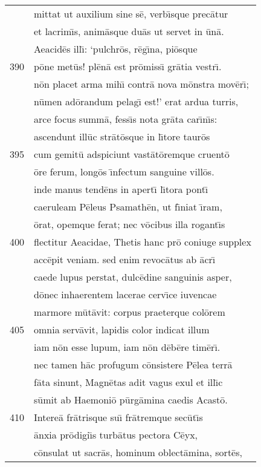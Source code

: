 \documentclass[paper=6in:9in,pagesize=pdftex,
               headinclude=on,footinclude=on,12pt]{scrbook}
\begin{document}
\begin{longtable}[p]{ r l }
 & mittat ut auxilium sine s\=e, verb\={\i}sque prec\=atur\\ 
 & et lacrim\={\i}s, anim\=asque du\=as ut servet in \=un\=a.\\ 
 & Aeacid\=es ill\={\i}: `pulchr\=os, r\=eg\={\i}na, pi\=osque\\ 
390 & p\=one met\=us! pl\=en\=a est pr\=omiss\={\i} gr\=atia vestr\={\i}.\\ 
 & n\=on placet arma mih\={\i} contr\=a nova m\=onstra mov\=er\={\i};\\ 
 & n\=umen ad\=orandum pelag\={\i} est!' erat ardua turris,\\ 
 & arce focus summ\=a, fess\={\i}s nota gr\=ata car\={\i}n\={\i}s:\\ 
 & ascendunt ill\=uc str\=at\=osque in l\={\i}tore taur\=os\\ 
395 & cum gemit\=u adspiciunt vast\=at\=oremque cruent\=o\\ 
 & \=ore ferum, long\=os \={\i}nfectum sanguine vill\=os.\\ 
 & inde manus tend\=ens in apert\={\i} l\={\i}tora pont\={\i}\\ 
 & caeruleam P\=eleus Psamath\=en, ut f\={\i}niat \={\i}ram,\\ 
 & \=orat, opemque ferat; nec v\=ocibus illa rogant\={\i}s\\ 
400 & flectitur Aeacidae, Thetis hanc pr\=o coniuge supplex\\ 
 & acc\=epit veniam. sed enim revoc\=atus ab \=acr\={\i}\\ 
 & caede lupus perstat, dulc\=edine sanguinis asper,\\ 
 & d\=onec inhaerentem lacerae cerv\={\i}ce iuvencae\\ 
 & marmore m\=ut\=avit: corpus praeterque col\=orem\\ 
405 & omnia serv\=avit, lapidis color indicat illum\\ 
 & iam n\=on esse lupum, iam n\=on d\=eb\=ere tim\=er\={\i}.\\ 
 & nec tamen h\=ac profugum c\=onsistere P\=elea terr\=a\\ 
 & f\=ata sinunt, Magn\=etas adit vagus exul et ill\={\i}c\\ 
 & s\=umit ab Haemoni\=o p\=urg\=amina caedis Acast\=o.\\ 
410 & \indent Intere\=a fr\=atrisque su\={\i} fr\=atremque sec\=ut\={\i}s\\ 
 & \=anxia pr\=odigi\={\i}s turb\=atus pectora C\=eyx,\\ 
 & c\=onsulat ut sacr\=as, hominum oblect\=amina, sort\=es,\\ 

\end{longtable}
\end{document}
